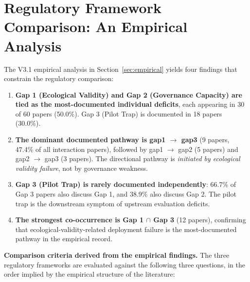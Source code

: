 
\section{Regulatory Framework Comparison: An Empirical Analysis}
\label{sec:regulatory}

The V3.1 empirical analysis in Section~\ref{sec:empirical} yields
four findings that constrain the regulatory comparison:

\begin{enumerate}
  \item \textbf{Gap 1 (Ecological Validity) and Gap 2 (Governance
        Capacity) are tied as the most-documented individual
        deficits}, each appearing in 30 of 60 papers (50.0\%).
        Gap 3 (Pilot Trap) is documented in 18 papers (30.0\%).
  \item \textbf{The dominant documented pathway is gap1 $\rightarrow$
        gap3} (9 papers, 47.4\% of all interaction papers),
        followed by gap1 $\rightarrow$ gap2 (5 papers) and
        gap2 $\rightarrow$ gap3 (3 papers). The directional
        pathway is \textit{initiated by ecological validity
        failure}, not by governance weakness.
  \item \textbf{Gap 3 (Pilot Trap) is rarely documented
        independently}: 66.7\% of Gap 3 papers also discuss
        Gap 1, and 38.9\% also discuss Gap 2. The pilot trap
        is the downstream symptom of upstream evaluation
        deficits.
  \item \textbf{The strongest co-occurrence is Gap 1 $\cap$ Gap 3}
        (12 papers), confirming that ecological-validity-related
        deployment failure is the most-documented pathway in
        the empirical record.
\end{enumerate}

\noindent\textbf{Comparison criteria derived from the empirical
findings.} The three regulatory frameworks are evaluated against
the following three questions, in the order implied by the
empirical structure of the literature:

